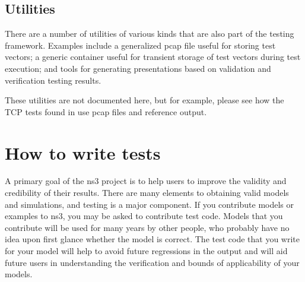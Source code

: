 \documentclass[letterpaper,10pt,english]{sphinxmanual}
\renewcommand{\sphinxcode}[1]{\texttt{\small{#1}}}
\begin{document}
\begin{sphinxVerbatim}[commandchars=\\\{\}]
    
   
     
     

 
    

 
     
\end{sphinxVerbatim}


\subsection{Utilities}
\label{\detokenize{test-framework:utilities}}
There are a number of utilities of various kinds that are also part of the
testing framework.  Examples include a generalized pcap file useful for
storing test vectors; a generic container useful for transient storage of
test vectors during test execution; and tools for generating presentations
based on validation and verification testing results.

These utilities are not documented here, but for example, please see
how the TCP tests found in \sphinxcode{} use pcap files and reference
output.


\section{How to write tests}
\label{\detokenize{how-to-write-tests:how-to-write-tests}}\label{\detokenize{how-to-write-tests::doc}}
A primary goal of the ns\sphinxhyphen{}3 project is to help users to improve the
validity and credibility of their results.  There are many elements
to obtaining valid models and simulations, and testing is a major
component.  If you contribute models or examples to ns\sphinxhyphen{}3, you may
be asked to contribute test code.  Models that you contribute will be
used for many years by other people, who probably have no idea upon
first glance whether the model is correct.  The test code that you
write for your model will help to avoid future regressions in
the output and will aid future users in understanding the verification
and bounds of applicability of your models.
\end{document}
